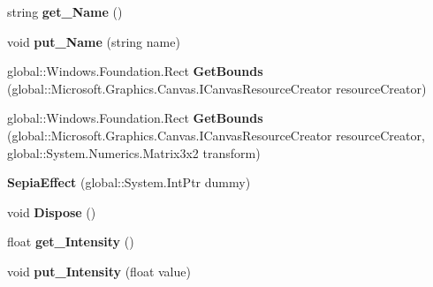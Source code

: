 \begin{DoxyCompactItemize}
string {\bfseries get\+\_\+\+Name} ()
\item 
\mbox{\label{class_microsoft_1_1_graphics_1_1_canvas_1_1_effects_1_1_sepia_effect_aada16984eae7d02db5a9f3c837166f22}} 
void {\bfseries put\+\_\+\+Name} (string name)
\item 
\mbox{\label{class_microsoft_1_1_graphics_1_1_canvas_1_1_effects_1_1_sepia_effect_add8f6369add3dc63f033fece446695bb}} 
global\+::\+Windows.\+Foundation.\+Rect {\bfseries Get\+Bounds} (global\+::\+Microsoft.\+Graphics.\+Canvas.\+I\+Canvas\+Resource\+Creator resource\+Creator)
\item 
\mbox{\label{class_microsoft_1_1_graphics_1_1_canvas_1_1_effects_1_1_sepia_effect_a383c90027b969cb3a3d212a103518d83}} 
global\+::\+Windows.\+Foundation.\+Rect {\bfseries Get\+Bounds} (global\+::\+Microsoft.\+Graphics.\+Canvas.\+I\+Canvas\+Resource\+Creator resource\+Creator, global\+::\+System.\+Numerics.\+Matrix3x2 transform)
\item 
\mbox{\label{class_microsoft_1_1_graphics_1_1_canvas_1_1_effects_1_1_sepia_effect_a4f03d37d7ecbcbf4f61d46c7966819d0}} 
{\bfseries Sepia\+Effect} (global\+::\+System.\+Int\+Ptr dummy)
\item 
\mbox{\label{class_microsoft_1_1_graphics_1_1_canvas_1_1_effects_1_1_sepia_effect_a3195a9cdd413f190255cdcda3170755b}} 
void {\bfseries Dispose} ()
\item 
\mbox{\label{class_microsoft_1_1_graphics_1_1_canvas_1_1_effects_1_1_sepia_effect_aa2ff226eed0accddfe57da8d29180372}} 
float {\bfseries get\+\_\+\+Intensity} ()
\item 
\mbox{\label{class_microsoft_1_1_graphics_1_1_canvas_1_1_effects_1_1_sepia_effect_a31889c7859564211fe6944237497aa2d}} 
void {\bfseries put\+\_\+\+Intensity} (float value)

\end{DoxyCompactItemize}
